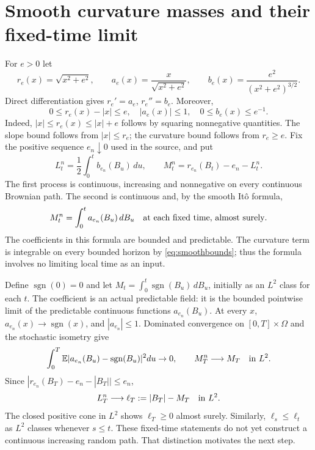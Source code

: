 \documentclass[11pt]{article}
\newcommand{\E}{\mathbb E}
\begin{document}
\section{Smooth curvature masses and their fixed-time limit}
For $e>0$ let
\[
 r_e(x)=\sqrt{x^2+e^2},\qquad
 a_e(x)=\frac{x}{\sqrt{x^2+e^2}},\qquad
 b_e(x)=\frac{e^2}{(x^2+e^2)^{3/2}}.
\]
Direct differentiation gives $r_e'=a_e$, $r_e''=b_e$. Moreover,
\begin{equation}\label{eq:smoothbounds}
 0\leq r_e(x)-|x|\leq e,\quad |a_e(x)|\leq1,
 \quad 0\leq b_e(x)\leq e^{-1}.
\end{equation}
Indeed, $|x|\leq r_e(x)\leq|x|+e$ follows by squaring
nonnegative quantities. The slope bound follows from $|x|\leq r_e$;
the curvature bound follows from $r_e\geq e$.
Fix the positive sequence $e_n\downarrow0$ used in the source, and put
\begin{equation}\label{eq:approximants}
 L_t^n=\frac12\int_0^t b_{e_n}(B_u)\,du,
 \qquad M_t^n=r_{e_n}(B_t)-e_n-L_t^n.
\end{equation}
The first process is continuous, increasing and nonnegative on every
continuous Brownian path. The second is continuous and, by the smooth
It\^o formula,
\begin{equation}\label{eq:smoothito}
 M_t^n=\int_0^t a_{e_n}(B_u)\,dB_u
 \quad\hbox{at each fixed time, almost surely}.
\end{equation}
The coefficients in this formula are bounded and predictable. The
curvature term is integrable on every bounded horizon by
\eqref{eq:smoothbounds}; thus the formula involves no limiting local
time as an input.

Define $\operatorname{sgn}(0)=0$ and let
$M_t=\int_0^t\operatorname{sgn}(B_u)\,dB_u$, initially as an $L^2$
class for each $t$. The coefficient is an actual predictable field:
it is the bounded pointwise limit of the predictable continuous
functions $a_{e_n}(B_u)$. At every $x$,
$a_{e_n}(x)\to\operatorname{sgn}(x)$, and $|a_{e_n}|\leq1$.
Dominated convergence on $[0,T]\times\Omega$ and the stochastic
isometry give
\begin{equation}\label{eq:fieldlimit}
 \int_0^T\E|a_{e_n}(B_u)-\operatorname{sgn}(B_u)|^2du\to0,
 \qquad M_T^n\longrightarrow M_T\quad\hbox{in }L^2.
\end{equation}
Since $|r_{e_n}(B_T)-e_n-|B_T||\leq e_n$,
\begin{equation}\label{eq:fixedlimit}
 L_T^n\longrightarrow \ell_T:=|B_T|-M_T\quad\hbox{in }L^2.
\end{equation}
The closed positive cone in $L^2$ shows $\ell_T\geq0$ almost surely.
Similarly, $\ell_s\leq\ell_t$ as $L^2$ classes whenever $s\leq t$.
These fixed-time statements do not yet construct a continuous
increasing random path. That distinction motivates the next step.
\end{document}
